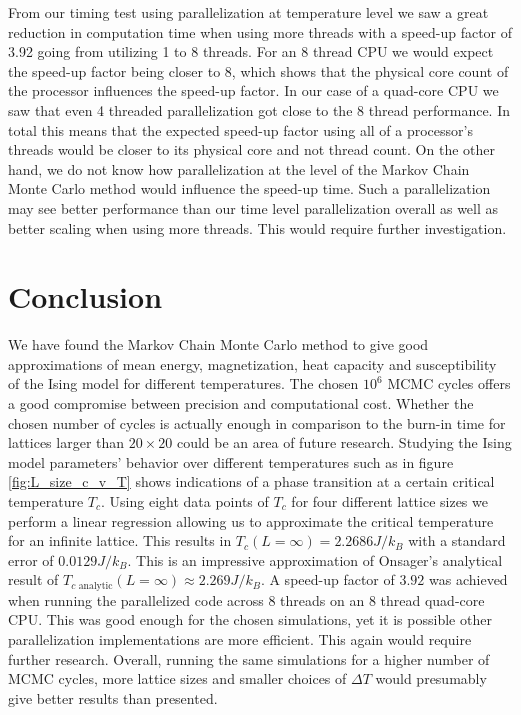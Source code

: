 \documentclass[english,notitlepage,reprint,nofootinbib]{revtex4-1}  %
\begin{document}
From our timing test using parallelization at temperature level we saw a great reduction in computation time when using more threads with a speed-up factor of 3.92 going from utilizing 1 to 8 threads. For an 8 thread CPU we would expect the speed-up factor being closer to 8, which shows that the physical core count of the processor influences the speed-up factor. In our case of a quad-core CPU we saw that even 4 threaded parallelization got close to the 8 thread performance. In total this means that the expected speed-up factor using all of a processor's threads would be closer to its physical core and not thread count. On the other hand, we do not know how parallelization at the level of the Markov Chain Monte Carlo method would influence the speed-up time. Such a parallelization may see better performance than our time level parallelization overall as well as better scaling when using more threads. This would require further investigation.


\section{Conclusion}\label{sec:conclusion}
We have found the Markov Chain Monte Carlo method to give good approximations of mean energy, magnetization, heat capacity and susceptibility of the Ising model for different temperatures. The chosen $10^6$ MCMC cycles offers a good compromise between precision and computational cost. Whether the chosen number of cycles is actually enough in comparison to the burn-in time for lattices larger than $20 \times 20$ could be an area of future research.
Studying the Ising model parameters' behavior over different temperatures such as in figure \ref{fig:L_size_c_v_T} shows indications of a phase transition at a certain critical temperature $T_c$. Using eight data points of $T_c$ for four different lattice sizes we perform a linear regression allowing us to approximate the critical temperature for an infinite lattice. This results in $ T_c(L=\infty) = 2.2686 J/k_B$ with a standard error of $0.0129 J/k_B$. This is an impressive approximation of Onsager's analytical result of  $T_{c \text{ analytic}}(L=\infty) \approx 2.269 J/k_B$. A speed-up factor of $3.92$ was achieved when running the parallelized code across 8 threads on an 8 thread quad-core CPU. This was good enough for the chosen simulations, yet it is possible other parallelization implementations are more efficient. This again would require further research. Overall, running the same simulations for a higher number of MCMC cycles, more lattice sizes and smaller choices of $\Delta T$ would presumably give better results than presented.
\end{document}
